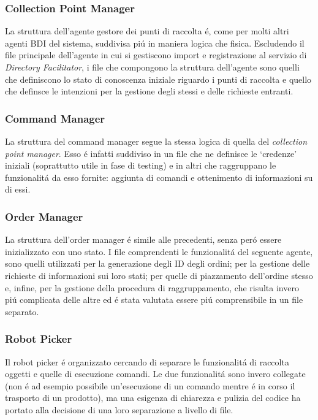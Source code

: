 \subsubsection{Collection Point Manager}
La struttura dell'agente gestore dei punti di raccolta \'e, come per molti altri agenti BDI del sistema, suddivisa pi\'u in maniera logica che fisica. Escludendo il file principale dell'agente in cui si gestiscono import e registrazione al servizio di \textit{Directory Facilitator}, i file che compongono la struttura dell'agente sono quelli che definiscono lo stato di conoscenza iniziale riguardo i punti di raccolta e quello che definsce le intenzioni per la gestione degli stessi e delle richieste entranti.

\subsubsection{Command Manager}
La struttura del command manager segue la stessa logica di quella del \textit{collection point manager}. Esso \'e infatti suddiviso in un file che ne definisce le `credenze' iniziali (soprattutto utile in fase di testing) e in altri che raggruppano le funzionalit\'a da esso fornite: aggiunta di comandi e ottenimento di informazioni su di essi.

\subsubsection{Order Manager}
La struttura dell'order manager \'e simile alle precedenti, senza per\'o essere inizializzato con uno stato. I file comprendenti le funzionalit\'a del seguente agente, sono quelli utilizzati per la generazione degli ID degli ordini; per la gestione delle richieste di informazioni sui loro stati; per quelle di piazzamento dell'ordine stesso e, infine, per la gestione della procedura di raggruppamento, che risulta invero pi\'u complicata delle altre ed \'e stata valutata essere pi\'u comprensibile in un file separato.

\subsubsection{Robot Picker}
Il robot picker \'e organizzato cercando di separare le funzionalit\'a di raccolta oggetti e quelle di esecuzione comandi. Le due funzionalit\'a sono invero collegate (non \'e ad esempio possibile un'esecuzione di un comando mentre \'e in corso il trasporto di un prodotto), ma una esigenza di chiarezza e pulizia del codice ha portato alla decisione di una loro separazione a livello di file.

